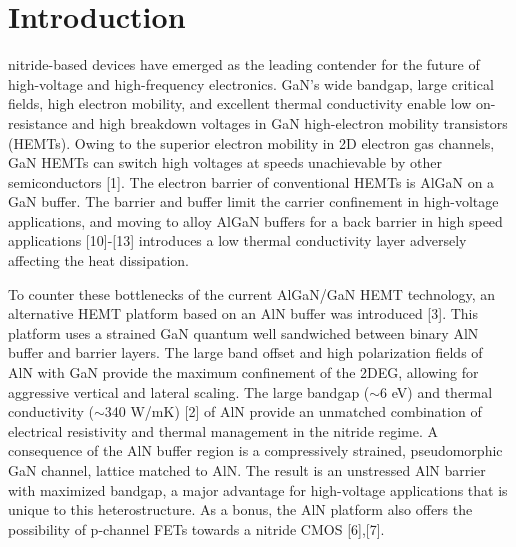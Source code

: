 \documentclass[journal]{IEEEtran}
\begin{document}
%
\IEEEpeerreviewmaketitle
\section{Introduction}
 nitride-based devices have emerged as the leading contender for the future of high-voltage and high-frequency electronics. GaN's wide bandgap, large critical fields, high electron mobility, and excellent thermal conductivity enable low on-resistance and high breakdown voltages in GaN high-electron mobility transistors (HEMTs). Owing to the superior electron mobility in 2D electron gas channels, GaN HEMTs can switch high voltages at speeds unachievable by other semiconductors [1]. The electron barrier of conventional HEMTs is AlGaN on a GaN buffer. The barrier and buffer limit the carrier confinement in high-voltage applications, and moving to alloy AlGaN buffers for a back barrier in high speed applications [10]-[13] introduces a low thermal conductivity layer adversely affecting the heat dissipation.

To counter these bottlenecks of the current AlGaN/GaN HEMT technology, an alternative HEMT platform based on an AlN buffer was introduced [3]. This platform uses a strained GaN quantum well sandwiched between binary AlN buffer and barrier layers. The large band offset and high polarization fields of AlN with GaN provide the maximum confinement of the 2DEG, allowing for aggressive vertical and lateral scaling. The large bandgap ($\sim$6 eV) and thermal conductivity ($\sim$340 W/mK) [2] of AlN provide an unmatched combination of electrical resistivity and thermal management in the nitride regime. A consequence of the AlN buffer region is a compressively strained, pseudomorphic GaN channel, lattice matched to AlN. The result is an unstressed AlN barrier with maximized bandgap, a major advantage for high-voltage applications that is unique to this heterostructure. As a bonus, the AlN platform also offers the possibility of p-channel FETs towards a nitride CMOS [6],[7].
\end{document}
